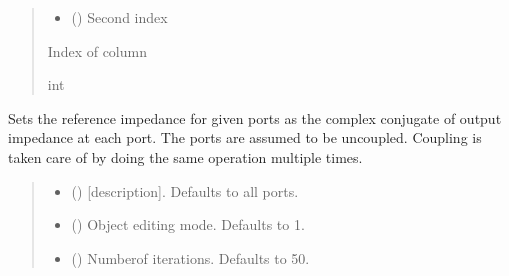 \documentclass[letterpaper,10pt,english]{sphinxmanual}
\begin{document}
\begin{fulllineitems}
\begin{fulllineitems}
\begin{quote}
\begin{description}
\begin{itemize}
\item {}
\sphinxAtStartPar
{} () \textendash{} Second index

\end{itemize}

\sphinxAtStartPar
Index of column

\sphinxAtStartPar
int

\end{description}\end{quote}

\end{fulllineitems}


\begin{fulllineitems}
\label{\detokenize{touchstone:touchstone.spfile.conj_match_uncoupled}}
\pysigstartsignatures
{}
\pysigstopsignatures
\sphinxAtStartPar
Sets the reference impedance for given ports as the complex conjugate of output impedance at each port.
The ports are assumed to be uncoupled. Coupling is taken care of by doing the same operation multiple times.
\begin{quote}\begin{description}
\begin{itemize}
\item {}
\sphinxAtStartPar
{} (\sphinxstyleliteralemphasis{\sphinxupquote{,}}) \textendash{} {[}description{]}. Defaults to all ports.

\item {}
\sphinxAtStartPar
{} (\sphinxstyleliteralemphasis{\sphinxupquote{, }}) \textendash{} Object editing mode. Defaults to \sphinxhyphen{}1.

\item {}
\sphinxAtStartPar
{} (\sphinxstyleliteralemphasis{\sphinxupquote{, }}) \textendash{} Numberof iterations. Defaults to 50.


\end{itemize}
\end{description}
\end{quote}
\end{fulllineitems}
\end{fulllineitems}
\end{document}
